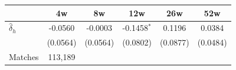 \begin{tabular}{l*{5}{c}}
\toprule
 & 4w & 8w & 12w & 26w & 52w \\
\midrule
$\hat{\delta}_h$ & -0.0560 & -0.0003 & -0.1458$^{*}$ & 0.1196 & 0.0384 \\
 & (0.0564) & (0.0564) & (0.0802) & (0.0877) & (0.0484) \\
\midrule
Matches & 113,189 \\
\bottomrule
\end{tabular}
